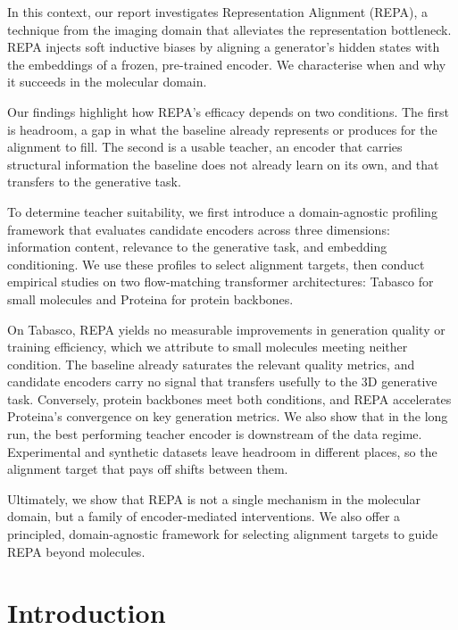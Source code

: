 \documentclass[12pt,a4paper,twoside]{report}
\newif\ifsubmission
\begin{document}
In this context, our report investigates Representation Alignment (REPA), a technique from the imaging domain that alleviates the representation bottleneck. REPA injects soft inductive biases by aligning a generator's hidden states with the embeddings of a frozen, pre-trained encoder. We characterise when and why it succeeds in the molecular domain.

Our findings highlight how REPA's efficacy depends on two conditions. The first is headroom, a gap in what the baseline already represents or produces for the alignment to fill. The second is a usable teacher, an encoder that carries structural information the baseline does not already learn on its own, and that transfers to the generative task.

To determine teacher suitability, we first introduce a domain-agnostic profiling framework that evaluates candidate encoders across three dimensions: information content, relevance to the generative task, and embedding conditioning. We use these profiles to select alignment targets, then conduct empirical studies on two flow-matching transformer architectures: Tabasco for small molecules and Proteina for protein backbones.

On Tabasco, REPA yields no measurable improvements in generation quality or training efficiency, which we attribute to small molecules meeting neither condition. The baseline already saturates the relevant quality metrics, and candidate encoders carry no signal that transfers usefully to the 3D generative task. Conversely, protein backbones meet both conditions, and REPA accelerates Proteina's convergence on key generation metrics. We also show that in the long run, the best performing teacher encoder is downstream of the data regime. Experimental and synthetic datasets leave headroom in different places, so the alignment target that pays off shifts between them.

Ultimately, we show that REPA is not a single mechanism in the molecular domain, but a family of encoder-mediated interventions. We also offer a principled, domain-agnostic framework for selecting alignment targets to guide REPA beyond molecules.

\ifsubmission\else



\fi
\cleardoublepage

\tableofcontents


\chapter{Introduction}
\label{ch:intro}
\end{document}
